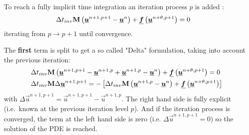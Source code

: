 To reach a fully implicit time integration an iteration process $p$ is added \citep[eqs.\ 15/16]{Borsboom2019a}:
\begin{align}
    &\Delta t_{inv} \mbox{\boldmath ${\mathrm{M}}$} \left( \mbox{\boldmath $\underline{u}$}^{n+1,p+1} - \mbox{\boldmath $\underline{u}$}^{n} \right)  +
    \mbox{\boldmath $\underline{f}$} \left( \mbox{\boldmath $\underline{u}$}^{n+\theta, p+1} \right) = 0
    \label{eq:1D_iteration}
\end{align}
iterating from $p \rightarrow p+1$ until convergence.

The \textbf{first} term is split to get a so called "Delta" formulation, taking into account the previous iteration:
\begin{align}
    &\Delta t_{inv} \mbox{\boldmath ${\mathrm{M}}$} \left( \mbox{\boldmath $\underline{u}$}^{n+1,p+1} - \mbox{\boldmath $\underline{u}$}^{n+1,p} + \mbox{\boldmath $\underline{u}$}^{n+1,p} - \mbox{\boldmath $\underline{u}$}^{n} \right) + \mbox{\boldmath $\underline{f}$} \left( \mbox{\boldmath $\underline{u}$}^{n+\theta, p+1} \right) = 0
    \\
    & \Delta t_{inv} \mbox{\boldmath ${\mathrm{M}}$} \Delta \mbox{\boldmath $\underline{u}$}^{n+1,p+1}   =
    - \left[ \Delta t_{inv} \mbox{\boldmath ${\mathrm{M}}$} \left( \mbox{\boldmath $\underline{u}$}^{n+1,p} - \mbox{\boldmath $\underline{u}$}^{n} \right) + \mbox{\boldmath $\underline{f}$} \left( \mbox{\boldmath $\underline{u}$}^{n+\theta, p+1} \right) \right]
\end{align}
with $\Delta \vec{u}^{n+1,p+1} = \vec{u}^{n+1,p+1} - \vec{u}^{n+1,p}$.
The right hand side is fully explicit (i.e.\ known at the previous iteration level $p$).
And if the iteration process is converged, the term at the left hand side is zero (i.e. $\Delta \vec{u}^{n+1,p+1} = 0$) so the solution of the PDE is reached.

